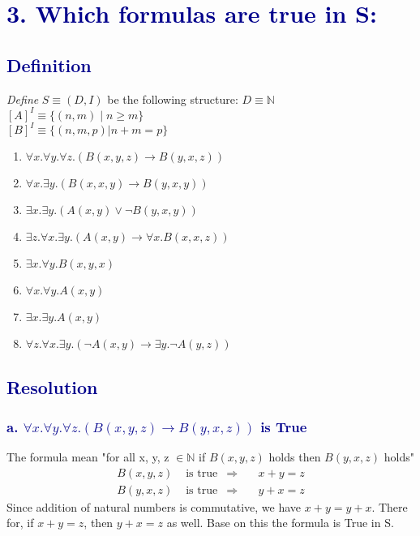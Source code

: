 \documentclass[12pt]{article}
\theoremstyle{definition}
\theoremstyle{plain}
\begin{document}
\section*{\textcolor{darkblue}{3. Which formulas are true in S:}}
\subsection*{\textcolor{darkblue}{Definition}}

\vspace{0.5cm}
\begin{tcolorbox}[colback=lightgray, colframe=darkblue, boxrule=1pt]
\textit{Define} $S \equiv (D,I)$ be the following structure:
 $D \equiv \mathbb{N}$ \\
 $[A]^I \equiv \{(n,m) \mid n \geq m\}$ \\
 $[B]^I \equiv \{(n,m,p) \vert n + m = p\}$
\end{tcolorbox}
\vspace{0.3cm}
\noindent
\begin{enumerate}[label=\alph*.]
  \item $\forall x.\forall y.\forall z.(B(x,y,z) \rightarrow B(y,x,z))$
  \item $\forall x. \exists y.(B(x,x,y) \rightarrow B(y,x,y))$
  \item $\exists x. \exists y.(A(x,y) \vee \neg B(y,x,y))$
  \item $\exists z. \forall x. \exists y.(A(x,y) \rightarrow \forall x.B(x,x,z))$
  \item $\exists x. \forall y.B(x,y,x)$
  \item $\forall x. \forall y.A(x,y)$
  \item $\exists x. \exists y.A(x,y)$
  \item $\forall z. \forall x. \exists y.(\neg A(x,y) \rightarrow \exists y. \neg A(y,z))$
\end{enumerate}
\subsection*{\textcolor{darkblue}{Resolution}}
\subsubsection*{\textcolor{darkblue}{a. $\forall x.\forall y.\forall z.(B(x,y,z) \rightarrow B(y,x,z))$ is True}}
The formula mean "for all x, y, z $\in \mathbb{N}$ if $B(x,y,z)$ holds then $B(y,x,z)$ holds"\\
\begin{align}
B(x,y,z) &\text{ is true} & \Rightarrow & \quad x + y = z \\
B(y,x,z) &\text{ is true} & \Rightarrow & \quad y + x = z
\end{align}
Since addition of natural numbers is commutative, we have $x + y = y + x$. There for, if $x+ y = z$, then $y + x = z$ as well. Base on this the formula is True in S.
\end{document}
